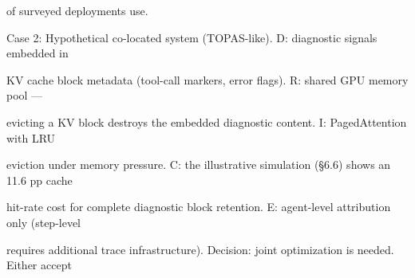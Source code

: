 \begin{flushleft}
\noindent of surveyed deployments use.\par
\par\smallskip
\noindent Case 2: Hypothetical co-located system (TOPAS-like). D: diagnostic signals embedded in\par
\noindent KV cache block metadata (tool-call markers, error flags). R: shared GPU memory pool —\par
\noindent evicting a KV block destroys the embedded diagnostic content. I: PagedAttention with LRU\par
\noindent eviction under memory pressure. C: the illustrative simulation (§6.6) shows an 11.6 pp cache\par
\noindent hit-rate cost for complete diagnostic block retention. E: agent-level attribution only (step-level\par
\noindent requires additional trace infrastructure). Decision: joint optimization is needed. Either accept\par
\end{flushleft}
